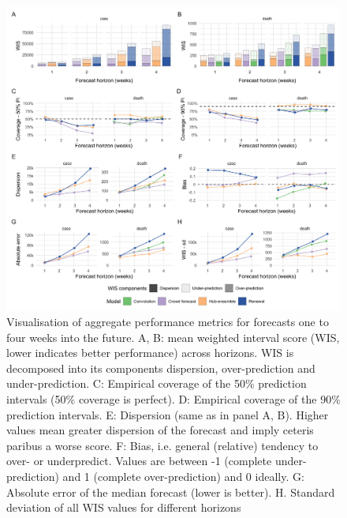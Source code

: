 \documentclass[10pt,letterpaper]{article}
\begin{document}
\begin{figure}[H]
\includegraphics[width=1\linewidth,]{../analysis/plots/aggregate-performance-all-v4} \caption{Visualisation of aggregate performance metrics for forecasts one to four weeks into the future. A, B: mean weighted interval score (WIS, lower indicates better performance) across horizons. WIS is decomposed into its components dispersion, over-prediction and under-prediction. C: Empirical coverage of the 50\% prediction intervals (50\% coverage is perfect). D: Empirical coverage of the 90\% prediction intervals. E: Dispersion (same as in panel A, B). Higher values mean greater dispersion of the forecast and imply ceteris paribus a worse score. F: Bias, i.e. general (relative) tendency to over- or underpredict. Values are between -1 (complete under-prediction) and 1 (complete over-prediction) and 0 ideally. G: Absolute error of the median forecast (lower is better). H. Standard deviation of all WIS values for different horizons}\label{fig:agg-performance-all}
\end{figure}
\end{document}
